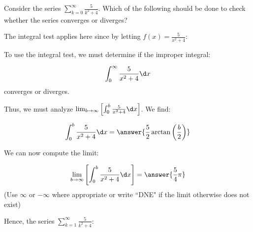 \documentclass{ximera}
\author{Jim Talamo}
\begin{document}
\begin{exercise}
Consider the series $\sum_{k=0}^{\infty} \frac{5}{k^2+4}$.  Which of the following should be done to check whether the series converges or diverges?
\begin{multipleChoice}
\end{multipleChoice}

\begin{exercise}
The integral test applies here since by letting $f(x) = \frac{5}{x^2+4}$:
\begin{selectAll}
\end{selectAll}

To use the integral test, we must determine if the improper integral:

\[
\int_0^{\infty} \frac{5}{x^2+4} \d x
\]
converges or diverges.

Thus, we must analyze $\lim_{b \to \infty} \left[\int_0^b \frac{5}{x^2+4} \d x\right]$.  We find:

\[
\int_0^b \frac{5}{x^2+4} \d x = \answer{\frac{5}{2} \arctan\left(\frac{b}{2}\right)}
\]

\begin{exercise}
We can now compute the limit:

\[ \lim_{b \to \infty} \left[\int_0^b \frac{5}{x^2+4} \d x\right] = \answer{\frac{5}{4} \pi} \]
(Use $\infty$ or $-\infty$ where appropriate or write ``DNE" if the limit otherwise does not exist)

Hence, the series  $\sum_{k=1}^{\infty} \frac{5}{k^2+4}$:
\begin{multipleChoice}
\end{multipleChoice}
\end{exercise}
\end{exercise}
\end{exercise}
\end{document}
